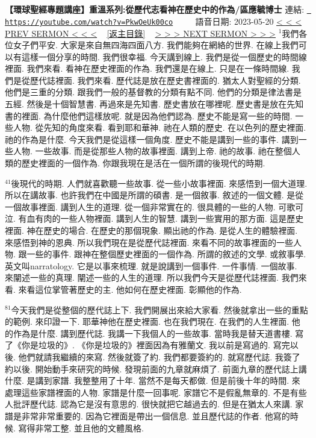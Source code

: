 \documentclass{book}
\begin{document}
\section{}
\label{sec:PkwOeUk00co}
\textbf{【環球聖經專題講座】重溫系列:從歷代志看神在歷史中的作為/區應毓博士}
\newline
\newline
連結: \href{https://youtube.com/watch?v=PkwOeUk00co}{\texttt{ https://youtube.com/watch?v=PkwOeUk00co}} ~~~~ 語音日期: 2023-05-20 
\newline
\newline
\hyperref[sec:8kvOuQqa6z0]{\small{< < < PREV SERMON < < <}}
~
\hyperref[sec:index]{\small{[返主目錄]}}
~
\hyperref[sec:zm_TxjjjYm8]{\small{> > > NEXT SERMON > > >}}
\newline
\newline
$^{1}$我們各位女子們平安.
大家是來自無四海四面八方.
我們能夠在網絡的世界.
在線上我們可以有這樣一個分享的時間.
我們很幸福.
今天講到線上.
我們是從一個歷史的時間線裡面.
我們來看.
看神在歷史裡面的作為.
我們還是在線上.
只是在一條時間線.
我們是從歷代誌裡面.
我們來看.
歷代誌是放在歷史書裡面的.
猶太人對聖經的分類.
他們是三重的分類.
跟我們一般的基督教的分類有點不同.
他們的分類是律法書是五經.
然後是十個智慧書.
再過來是先知書.
歷史書放在哪裡呢.
歷史書是放在先知書的裡面.
為什麼他們這樣放呢.
就是因為他們認為.
歷史不能是寫一些的時間.
一些人物.
從先知的角度來看.
看到耶和華神.
祂在人類的歷史.
在以色列的歷史裡面.
祂的作為是什麼.
今天我們是從這樣一個角度.
歷史不能是講到一些的事件.
講到一些人物.
一些故事.
而是從那些人物的故事裡面.
講到上帝.
祂的故事.
祂在整個人類的歷史裡面的一個作為.
你跟我現在是活在一個所謂的後現代的時期.

$^{41}$後現代的時期.
人們就喜歡聽一些故事.
從一些小故事裡面.
來感悟到一個大道理.
所以在講故事.
也許我們在中國是所謂的碩書.
是一個敘事.
敘述的一個文體.
是從一個故事裡面.
講到人生的道理.
從一個非常實在的.
很具體的一些的人物.
可歌可泣.
有血有肉的一些人物裡面.
講到人生的智慧.
講到一些實用的那方面.
這是歷史裡面.
神在歷史的場合.
在歷史的那個現象.
顯出祂的作為.
是從人生的體驗裡面.
來感悟到神的恩典.
所以我們現在是從歷代誌裡面.
來看不同的故事裡面的一些人物.
跟一些的事件.
跟神在整個歷史裡面的一個作為.
所謂的敘述的文學.
或敘事學.
英文叫narratology.
它是以事來梳理.
就是說講到一個事件.
一件事情.
一個故事.
來闡述一些的真理.
闡述一些的人生的道理.
所以我們今天是從歷代誌裡面.
我們來看.
來看這位掌管著歷史的主.
他如何在歷史裡面.
彰顯他的作為.

$^{81}$今天我們是從整個的歷代誌上下.
我們開展出來給大家看.
然後就拿出一些的重點的範例.
來印證一下.
耶華神他在歷史裡面.
也在我們現在.
在我們的人生裡面.
他的作為是什麼.
講到歷代誌.
我講一下我個人的一些故事.
當時我是替天道書樓.
寫了《你是垃圾的》.
《你是垃圾的》裡面因為有雅蘭文.
我以前是寫過的.
寫完以後.
他們就請我繼續的來寫.
然後就簽了約.
我們都要簽約的.
就寫歷代誌.
我簽了約以後.
開始動手來研究的時候.
發現前面的九章就麻煩了.
前面九章的歷代誌上講什麼.
是講到家譜.
我整整用了十年.
當然不是每天都做.
但是前後十年的時間.
來處理這些家譜裡面的人物.
家譜是什麼一回事呢.
家譜它不是假亂無章的.
不是有些人批評歷代誌.
認為它是沒有意思的.
很快就把它越過去的.
但是在猶太人來講.
家譜是非常非常重要的.
因為它裡面是帶出一個信息.
並且歷代誌的作者.
他寫的時候.
寫得非常工整.
並且他的文體風格.
\end{document}
